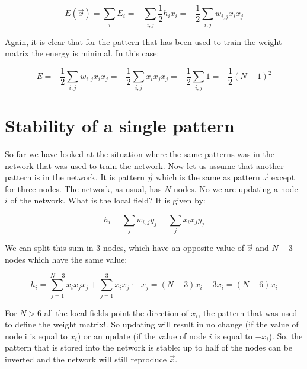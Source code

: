 \documentclass[12pt, right open]{memoir}
\begin{document}
\[
E(\vec{x}) = \sum_i E_i = - \sum_{i,j}\frac{1}{2}h_ix_i = -\frac{1}{2}\sum_{i,j}w_{i,j}x_ix_j
\]

Again, it is clear that for the pattern that has been used to train the weight
matrix the energy is minimal. In this case:

\[
E = -\frac{1}{2} \sum_{i,j}w_{i,j}x_ix_j = -\frac{1}{2} \sum_{i,j}x_ix_jx_j = -\frac{1}{2}
\sum_{i,j}1 = -\frac{1}{2}(N-1)^2
\]
\section{Stability of a single pattern}
So far we have looked at the situation where the same patterns was in the
network that was used to train the network. Now let us assume that another
pattern is in the network. It is pattern $\vec{y}$ which is the same as pattern $\vec{x}$ except for three nodes. The network, as usual, has $N$ nodes. No we are updating a
node $i$ of the network. What is the local field? It is given by:

\[
h_i = \sum_j w_{i,j}y_j = \sum_j x_ix_jy_j 
\]

We can split this sum in 3 nodes, which have an opposite value of $\vec{x}$ and
$N − 3$ nodes which have the same value:

\[
h_i = \sum^{N-3}_{j=1} x_ix_jx_j + \sum^3_{j=1} x_ix_j · -x_j = (N - 3)x_i - 3x_i = (N - 6)x_i
\]

For $N > 6$ all the local fields point the direction of $x_i$, the pattern that was
used to define the weight matrix!. So updating will result in no change (if the
value of node i is equal to $x_i$) or an update (if the value of node $i$ is equal to
$-x_i$). So, the pattern that is stored into the network is stable: up to half of the
nodes can be inverted and the network will still reproduce $\vec{x}$.

%
\end{document}
